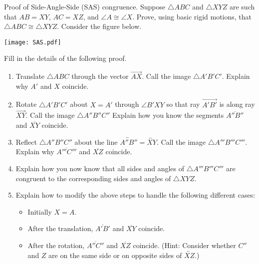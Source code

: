 \documentclass[nooutcomes]{ximera}
\begin{document}
\begin{problem}
Proof of Side-Angle-Side (SAS) congruence.  Suppose $\triangle ABC$ and $\triangle XYZ$ are such that $AB=XY$, $AC=XZ$, and $\angle A \cong \angle X$.  Prove, using basic rigid motions, that $\triangle ABC \cong \triangle XYZ$.  Consider the figure below.  
\begin{image}
\texttt{[image: SAS.pdf]}
\end{image}
Fill in the details of the following proof.  
\begin{enumerate}
\item Translate $\triangle ABC$ through the vector $\overrightarrow{AX}$.  Call the image $\triangle A'B'C'$.  Explain why $A'$ and $X$ coincide.
\vspace{1in}
\item Rotate $\triangle A'B'C'$ about $X=A'$ through $\angle B'XY$ so that ray $\overrightarrow{A'B'}$ is along ray $\overrightarrow{XY}$.  Call the image $\triangle A''B''C''$   Explain how you know the segments $\overline{A''B''}$ and $\overline{XY}$ coincide. 
\vspace{1in}
\item Reflect $\triangle A''B''C''$ about the line $\overleftrightarrow{A''B''} = \overleftrightarrow{XY}$.  Call the image $\triangle A'''B'''C'''$.  Explain why $\overline{A'''C'''}$ and $\overline{XZ}$ coincide.
\vspace{1in}
\item Explain how you now know that all sides and angles of $\triangle A'''B'''C'''$ are congruent to the corresponding sides and angles of $\triangle XYZ$.  
\vspace{1in}
\item Explain how to modify the above steps to handle the following different cases: 
\begin{itemize}
\item Initially $X = A$. 
\item After the translation, $\overline{A'B'}$ and $\overline{XY}$ coincide. 
\item After the rotation, $\overline{A''C''}$ and $\overline{XZ}$ coincide.  (Hint:  Consider whether $C''$ and $Z$ are on the same side or on opposite sides of $\overleftrightarrow{XZ}$.)  
\end{itemize}
\end{enumerate}
\vfill
\end{problem}
\end{document}
